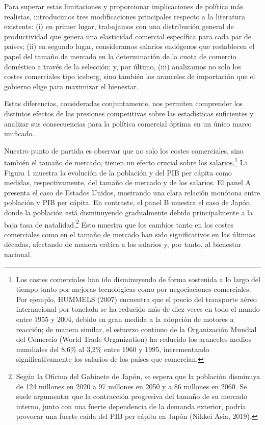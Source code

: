 \documentclass[10pt,a4paper]{article}
\begin{document}
Para superar estas limitaciones y proporcionar implicaciones de política más realistas, introducimos tres modificaciones principales respecto a la literatura existente: (i) en primer lugar, trabajamos con una distribución general de productividad que genera una elasticidad comercial específica para cada par de países; (ii) en segundo lugar, consideramos salarios endógenos que restablecen el papel del tamaño de mercado en la determinación de la cuota de comercio doméstico a través de la selección; y, por último, (iii) analizamos no solo los costes comerciales tipo iceberg, sino también los aranceles de importación que el gobierno elige para maximizar el bienestar. 

Estas diferencias, consideradas conjuntamente, nos permiten comprender los distintos efectos de las presiones competitivas sobre las estadísticas suficientes y analizar sus consecuencias para la política comercial óptima en un único marco unificado.

Nuestro punto de partida es observar que no solo los costes comerciales, sino también el tamaño de mercado, tienen un efecto crucial sobre los salarios.\footnote{%
    Los costes comerciales han ido disminuyendo de forma sostenida a lo largo del tiempo tanto por mejoras tecnológicas como por negociaciones comerciales. Por ejemplo, HUMMELS (2007) encuentra que el precio del transporte aéreo internacional por tonelada se ha reducido más de diez veces en todo el mundo entre 1955 y 2004, debido en gran medida a la adopción de motores a reacción; de manera similar, el esfuerzo continuo de la Organización Mundial del Comercio (World Trade Organization) ha reducido los aranceles medios mundiales del 8,6\% al 3,2\% entre 1960 y 1995, incrementando significativamente los salarios de los países que comercian.
} La Figura 1 muestra la evolución de la población y del PIB per cápita como medidas, respectivamente, del tamaño de mercado y de los salarios. El panel A presenta el caso de Estados Unidos, mostrando una clara relación monótona entre población y PIB per cápita. En contraste, el panel B muestra el caso de Japón, donde la población está disminuyendo gradualmente debido principalmente a la baja tasa de natalidad.\footnote{%
    Según la Oficina del Gabinete de Japón, se espera que la población disminuya de 124 millones en 2020 a 97 millones en 2050 y a 86 millones en 2060. Se suele argumentar que la contracción progresiva del tamaño de su mercado interno, junto con una fuerte dependencia de la demanda exterior, podría provocar una fuerte caída del PIB per cápita en Japón (Nikkei Asia, 2019).
} Esto muestra que los cambios tanto en los costes comerciales como en el tamaño de mercado han sido significativos en las últimas décadas, afectando de manera crítica a los salarios y, por tanto, al bienestar nacional.
\end{document}
